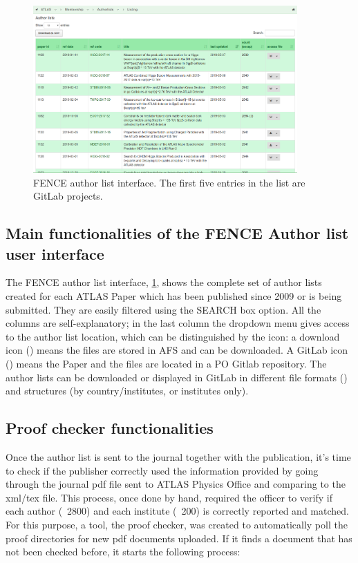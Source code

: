 \begin{figure}[htb]
  \centering
  \includegraphics[width=0.9\textwidth]{figures/authorlist_interface.png}%
  \caption{FENCE author list interface.
    The first five entries in the list are GitLab projects.}%
  \label{fig:authorlist_interface}
\end{figure}

\subsection{Main functionalities of the FENCE Author list user interface}
\label{sec:Main_functionalities_of_the_FENCE_Author_list_user_interface}

The FENCE author list interface, \cref{fig:authorlist_interface}, shows the complete set of author lists created for each ATLAS Paper which has been published since 2009 or is being submitted.
They are easily filtered using the SEARCH box option.
All the columns are self-explanatory; in the last column the dropdown menu gives access to the author list location, which can be distinguished by the icon:
a download icon (\faDownload) means the files are stored in AFS and can be downloaded.
A GitLab icon (\faGitlab) means the Paper and the files are located in a PO Gitlab repository. The author lists can be downloaded or displayed in GitLab in different file formats () and structures (by country/institutes, or institutes only). 

\subsection{Proof checker functionalities}
\label{sec:Proof_checker_functionalities}
Once the author list is sent to the journal together with the publication, it’s time to check if the publisher correctly used the information provided by going through the journal pdf file sent to ATLAS Physics Office and comparing to the xml/tex file. This process, once done by hand, required the officer to verify if each author (~2800) and each institute (~200) is correctly reported and matched. 
For this purpose, a tool, the proof checker, was created to automatically poll the proof directories for new pdf documents uploaded. If it finds a document that has not been checked before, it starts the following process:

